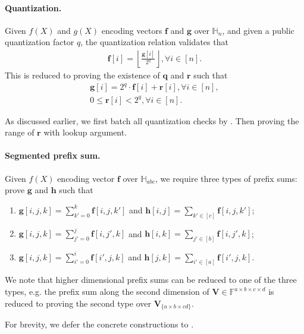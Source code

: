 \paragraph{Quantization.}
Given $f(X)$ and $g(X)$ encoding vectors $\mathbf{f}$ and $\mathbf{g}$ over $\mathbb{H}_n$,
    and given a public quantization factor $q$,
    the quantization relation validates that
    \begin{align}
        \mathbf{f}[i] = \left\lfloor \frac{\mathbf{g}[i]}{2^q} \right\rfloor, \forall i\in [n].
    \end{align}
    This is reduced to proving the existence of $\mathbf{q}$ and $\mathbf{r}$ such that
    \begin{align}
        \mathbf{g}[i] = 2^q \cdot \mathbf{f}[i] + \mathbf{r}[i], \forall i\in [n], \\
        0 \leq \mathbf{r}[i] < 2^q, \forall i\in [n].
    \end{align}

As discussed earlier, we first batch all quantization checks
    by .
    Then proving the range of $\mathbf{r}$ with lookup argument.

\paragraph{Segmented prefix sum.}
Given $f(X)$ encoding vector $\mathbf{f}$ over $\mathbb{H}_{abc}$,
    we require three types of prefix sums:
    prove $\mathbf{g}$ and $\mathbf{h}$ such that
    \begin{enumerate}
        \item $\mathbf{g}[i, j, k] = \sum_{k'=0}^{k} \mathbf{f}[i, j, k']$ and $\mathbf{h}[i, j] = \sum_{k'\in[c]} \mathbf{f}[i, j, k']$;
        \item $\mathbf{g}[i, j, k] = \sum_{j'=0}^{j} \mathbf{f}[i, j', k]$ and $\mathbf{h}[i, k] = \sum_{j'\in[b]} \mathbf{f}[i, j', k]$;
        \item $\mathbf{g}[i, j, k] = \sum_{i'=0}^{i} \mathbf{f}[i', j, k]$ and $\mathbf{h}[j, k] = \sum_{i'\in[a]} \mathbf{f}[i', j, k]$.
    \end{enumerate}
    We note that higher dimensional prefix sums can be reduced to 
    one of the three types,
    e.g. the prefix sum along the second dimension of
    $\mathbf{V}\in \mathbb{F}^{a\times b\times c\times d}$
    is reduced to proving the second type over
    $\mathbf{V}_{\{a\times b\times cd\}}$.
    
For brevity, we defer the concrete constructions to .

